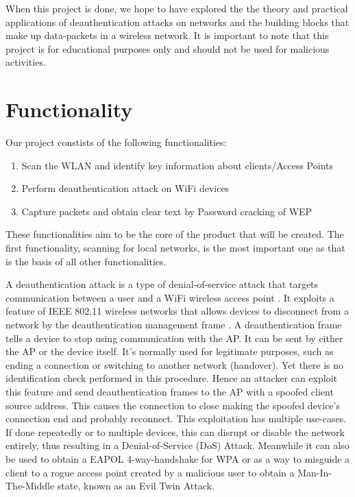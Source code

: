 When this project is done, we hope to have explored the the theory and practical applications of deauthentication attacks on networks and the building blocks that make up data-packets in a wireless network. It is important to note that this project is for educational purposes only and should not be used for malicious activities.

\section{Functionality}
Our project constists of the following functionalities:
\begin{enumerate}
    \item Scan the WLAN and identify key information about clients/Access Points
    \item Perform deauthentication attack on WiFi devices
    \item Capture packets and obtain clear text by Password cracking of WEP
\end{enumerate}

These functionalities aim to be the core of the product that will be created. The first functionality, scanning for local networks, is the most important one as that is the basis of all other functionalities.

A deauthentication attack is a type of denial-of-service attack that targets communication between a user and a WiFi wireless access point \cite{Deauth}. It exploits a feature of IEEE 802.11 wireless networks that allows devices to disconnect from a network by the deauthentication management frame \cite{Deauth_Wiki}.
A deauthentication frame tells a device to stop using communication with the AP. It can be sent by either the AP or the device itself. It's normally used for legitimate purposes, such as ending a connection or switching to another network (handover). Yet there is no identification check performed in this procedure. Hence an attacker can exploit this feature and send deauthentication frames to the AP with a spoofed client source address. This causes the connection to close making the spoofed device's connection end and probably reconnect. This exploitation has multiple use-cases. If done repeatedly or to multiple devices, this can disrupt or disable the network entirely, thus resulting in a Denial-of-Service (DoS) Attack. Meanwhile it can also be used to obtain a EAPOL 4-way-handshake for WPA or as a way to misguide a client to a rogue access point created by a malicious user to obtain a Man-In-The-Middle state, known as an Evil Twin Attack. 

